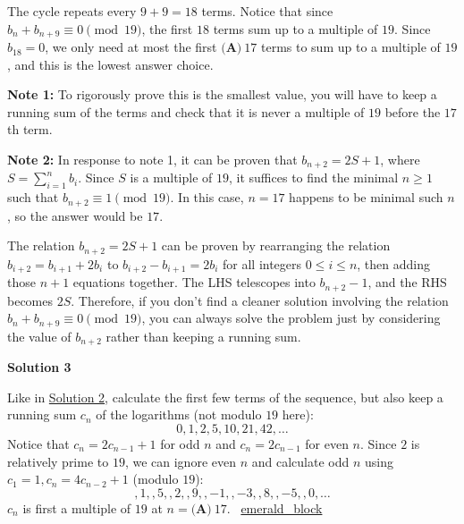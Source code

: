 \begin{enumerate}
 The cycle repeats every $9+9=18$ terms. Notice that since $b_n+b_{n+9} \equiv 0 \pmod{19}$, the first $18$ terms sum up to a multiple of $19$. Since $b_{18}=0$, we only need at most the first $\boxed{\textbf{(A)}\ 17}$ terms to sum up to a multiple of $19$, and this is the lowest answer choice.

 \textbf{Note 1:} To rigorously prove this is the smallest value, you will have to keep a running sum of the terms and check that it is never a multiple of $19$ before the $17$th term.

 \textbf{Note 2:} In response to note 1, it can be proven that $b_{n+2} = 2S + 1$, where $S = \sum^{n}_{i=1} b_i$. Since $S$ is a multiple of $19$, it suffices to find the minimal $n \geq 1$ such that $b_{n+2} \equiv 1 \pmod {19}$. In this case, $n = 17$ happens to be minimal such $n$, so the answer would be $17$.

 The relation $b_{n+2} = 2S + 1$ can be proven by rearranging the relation $b_{i+2} = b_{i+1} + 2b_i$ to $b_{i+2} - b_{i+1} = 2b_i$ for all integers $0 \leq i \leq n$, then adding those $n+1$ equations together. The LHS telescopes into $b_{n+2} - 1$, and the RHS becomes $2S$. Therefore, if you don't find a cleaner solution involving the relation $b_n+b_{n+9} \equiv 0 \pmod{19}$, you can always solve the problem just by considering the value of $b_{n+2}$ rather than keeping a running sum.

 



\textbf{Solution 3}

Like in \href{https://artofproblemsolving.com\#Solution\_2}{Solution 2}, calculate the first few terms of the sequence, but also keep a running sum $c_n$ of the logarithms (not modulo $19$ here):
 \[0,1,2,5,10,21,42,\dots\]Notice that $c_n=2c_{n-1}+1$ for odd $n$ and $c_n=2c_{n-1}$ for even $n$. Since $2$ is relatively prime to $19$, we can ignore even $n$ and calculate odd $n$ using $c_1 = 1, c_{n} = 4c_{n-2}+1$ (modulo $19$):
 \[,1,,5,,2,,9,,-1,,-3,,8,,-5,,0,\dots\]$c_n$ is first a multiple of $19$ at $n = \boxed{\textbf{(A)}\ 17}$. ~\href{https://artofproblemsolving.com/wiki/index.php?title=User:Emerald\_block}{emerald\_block}

 


\end{enumerate}